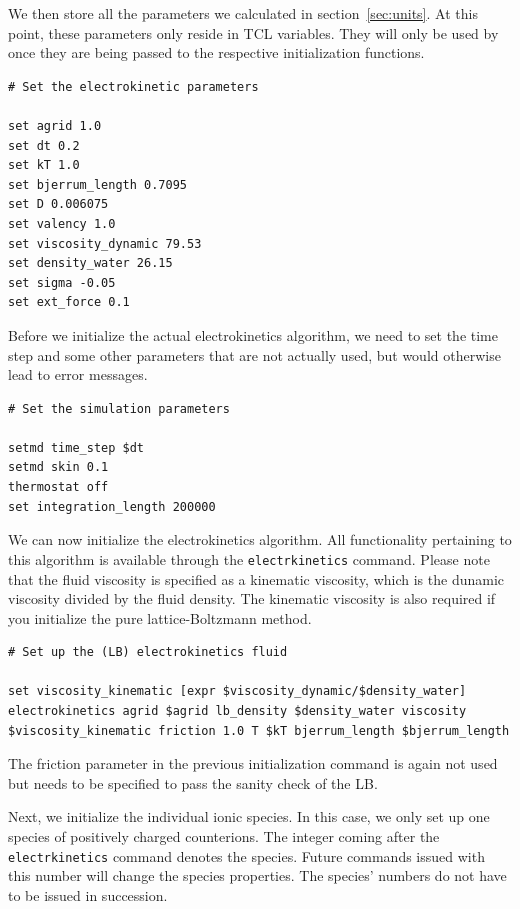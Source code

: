 We then store all the parameters we calculated in section~\ref{sec:units}. At this point, these parameters only reside in TCL variables. They will only be used by \ES{} once they are being passed to the respective initialization functions.

\begin{lstlisting}[firstnumber=13]
# Set the electrokinetic parameters

set agrid 1.0
set dt 0.2
set kT 1.0
set bjerrum_length 0.7095
set D 0.006075
set valency 1.0
set viscosity_dynamic 79.53
set density_water 26.15
set sigma -0.05
set ext_force 0.1
\end{lstlisting}

Before we initialize the actual electrokinetics algorithm, we need to set the time step and some other parameters that are not actually used, but would otherwise lead to error messages.

\begin{lstlisting}[firstnumber=26]
# Set the simulation parameters

setmd time_step $dt
setmd skin 0.1
thermostat off
set integration_length 200000
\end{lstlisting}

We can now initialize the electrokinetics algorithm. All functionality pertaining to this algorithm is available through the \texttt{electrkinetics} command. Please note that the fluid viscosity is specified as a kinematic viscosity, which is the dunamic viscosity divided by the fluid density. The kinematic viscosity is also required if you initialize the pure lattice-Boltzmann method.

\begin{lstlisting}[firstnumber=33]
# Set up the (LB) electrokinetics fluid

set viscosity_kinematic [expr $viscosity_dynamic/$density_water]
electrokinetics agrid $agrid lb_density $density_water viscosity $viscosity_kinematic friction 1.0 T $kT bjerrum_length $bjerrum_length
\end{lstlisting}

The friction parameter in the previous initialization command is again not used but needs to be specified to pass the sanity check of the LB.

Next, we initialize the individual ionic species. In this case, we only set up one species of positively charged counterions. The integer coming after the \texttt{electrkinetics} command denotes the species. Future commands issued with this number will change the species properties. The species' numbers do not have to be issued in succession.

